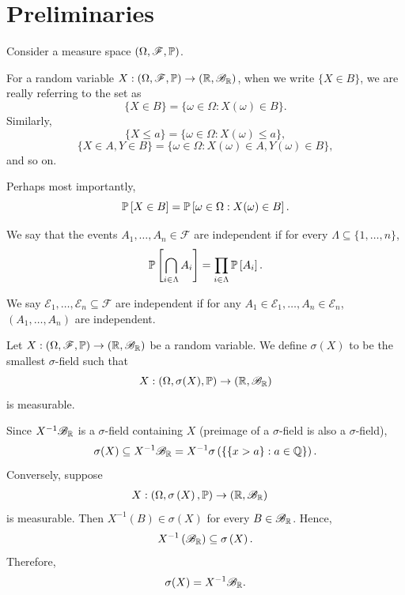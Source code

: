 \section{Preliminaries}

Consider a measure space $\left( \Omega, \mathscr{F}, \P\right)$. 

\begin{notation}
	For a random variable $X: \left( \Omega, \mathscr{F}, \P \right) \to \left( \R, \mathscr{B}_{\R} \right)$, when we write $\{X \in B\}$, we are really referring to the set as \[
		\{X \in B\} = \{\omega \in \Omega: X(\omega) \in B\}
	.\] Similarly, \[
		\{X \le a\} = \{\omega \in \Omega: X(\omega) \le a\}
	,\] \[
		\{X \in A, Y \in B\} = \{\omega \in \Omega: X(\omega) \in A, Y(\omega) \in B\}
	,\] and so on.

	Perhaps most importantly, \[
		\P\left[X \in B\right] = \P\left[\omega \in \Omega: X(\omega) \in B\right] 
	.\] 
\end{notation}

\begin{definition}
	We say that the events $A_1,\ldots,A_n \in \mathscr{F}$ are independent if for every $\Lambda \subseteq \{1,\ldots,n\}$, \[
		\P \left[ \bigcap\limits_{i\in \Lambda}^{} A_i \right] = \prod_{i \in \Lambda}^{} \P\left[A_i\right]  
	.\] 

	We say $\mathscr{E}_1,\ldots,\mathscr{E}_n \subseteq \mathscr{F}$ are independent if for any $A_1 \in \mathscr{E}_1,\ldots,A_n \in \mathscr{E}_n$, $\left( A_1,\ldots,A_n \right)$ are independent.
\end{definition}

\begin{definition}
	Let $X: (\Omega, \mathscr{F}, \P) \to \left( \R,\mathscr{B}_{\R} \right)$ be a random variable. We define $\sigma(X)$ to be the smallest $\sigma$-field such that \[
		X: (\Omega, \sigma(X), \P) \to \left( \R,\mathscr{B}_\R \right)
	\] is measurable.

	Since $X ^{-1} \mathscr{B}_{\R}$ is a $\sigma$-field containing $X$ (preimage of a $\sigma$-field is also a $\sigma$-field), \[
		\sigma(X) \subseteq  X^{-1}\mathscr{B}_\R = X^{-1} \sigma\left( \{\{x > a\}: a \in \Q\} \right)
	.\]
	Conversely, suppose
	\[
		\begin{aligned}
			X: \left( \Omega, \sigma\left( X \right), \P \right)
			&\to \left( \R, \mathscr{B}_\R \right)
		\end{aligned}
	\]
	is measurable.
	Then $X ^{-1}(B) \in \sigma\left( X \right)$ for every $B \in \mathscr{B}_\R$.
	Hence,
	\[
		X ^{-1}\left( \mathscr{B}_\R \right) \subseteq \sigma\left( X \right)
	.\]
	Therefore,
	\[
		\sigma(X) = X ^{-1}\mathscr{B}_\R
	.\] 
\end{definition}

